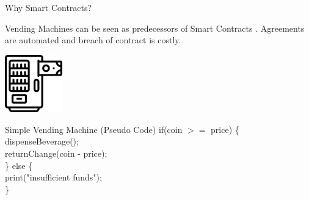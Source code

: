 \documentclass[handout]{beamer}
\begin{document}
\begin{frame}{Why Smart Contracts?}

Vending Machines can be seen as predecessors of Smart Contracts \cite{NS:94,NS:97}. Agreements are automated and breach of contract is costly.

\vspace{0.5em}

\begin{minipage}{0.4\textwidth}
	\vspace{0.5em}
	\centering
	\includegraphics[width=2.5cm]{../assets/images/vendingmachine.png}
\end{minipage}
\begin{minipage}{0.55\textwidth}
	\begin{samplecode}{Simple Vending Machine (Pseudo Code)}
		if(coin $>=$ price) \{ \\
			\tab dispenseBeverage(); \\
			\tab returnChange(coin - price);\\
		\} else \{ \\
			\tab print("insufficient funds"); \\
		\}
	\end{samplecode}	
\end{minipage}



\end{frame}
\end{document}
